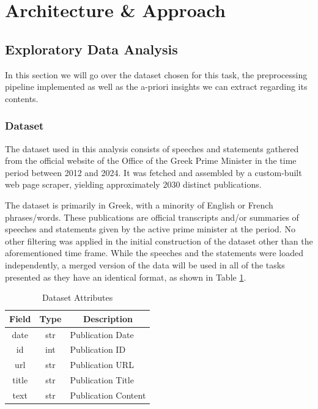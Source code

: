 \section{Architecture \& Approach}
\label{sec:architecture}
\subsection{Exploratory Data Analysis}
In this section we will go over the dataset chosen for this task, the preprocessing pipeline implemented as well as the a-priori insights we can extract regarding its contents.

\subsubsection{Dataset}
The dataset used in this analysis consists of speeches and statements gathered from the official website of the Office of the Greek Prime Minister in the time period between 2012 and 2024. It was fetched and assembled by a custom-built web page scraper, yielding approximately $2030$ distinct publications. 

The dataset is primarily in Greek, with a minority of English or French phrases/words. These publications are official transcripts and/or summaries of speeches and statements given by the active prime minister at the period. No other filtering was applied in the initial construction of the dataset other than the aforementioned time frame. While the speeches and the statements were loaded independently, a merged version of the data will be used in all of the tasks presented as they have an identical format, as shown in Table \ref{tab:dataset}.

\begin{table}[H]
\centering
\begin{tabular}{c|c|l}
\toprule
\textbf{Field} & \textbf{Type} & \multicolumn{1}{c}{\textbf{Description}} \\
\midrule
date   & str & Publication Date \\
id     & int & Publication ID \\
url    & str & Publication URL \\
title  & str & Publication Title \\
text   & str & Publication Content \\
\bottomrule
\end{tabular}
\caption{Dataset Attributes}
\label{tab:dataset}
\end{table}

